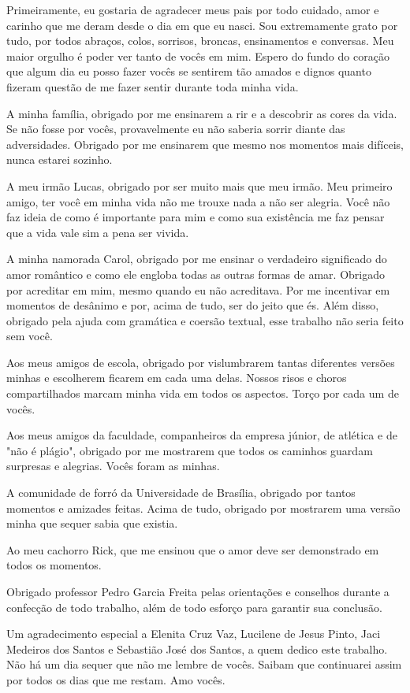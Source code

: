 Primeiramente, eu gostaria de agradecer meus pais por todo cuidado, amor e carinho que me deram desde o dia em que eu nasci. Sou extremamente grato por tudo, por todos abraços, colos, sorrisos, broncas, ensinamentos e conversas. Meu maior orgulho é poder ver tanto de vocês em mim. Espero do fundo do coração que algum dia eu posso fazer vocês se sentirem tão amados e dignos quanto fizeram questão de me fazer sentir durante toda minha vida.

A minha família, obrigado por me ensinarem a rir e a descobrir as cores da vida. Se não fosse por vocês, provavelmente eu não saberia sorrir diante das adversidades. Obrigado por me ensinarem que mesmo nos momentos mais difíceis, nunca estarei sozinho.

A meu irmão Lucas, obrigado por ser muito mais que meu irmão. Meu primeiro amigo, ter você em minha vida não me trouxe nada a não ser alegria. Você não faz ideia de como é importante para mim e como sua existência me faz pensar que a vida vale sim a pena ser vivida.

A minha namorada Carol, obrigado por me ensinar o verdadeiro significado do amor romântico e como ele engloba todas as outras formas de amar. Obrigado por acreditar em mim, mesmo quando eu não acreditava. Por me incentivar em momentos de desânimo e por, acima de tudo, ser do jeito que és. Além disso, obrigado pela ajuda com gramática e coersão textual, esse trabalho não seria feito sem você.

Aos meus amigos de escola, obrigado por vislumbrarem tantas diferentes versões minhas e escolherem ficarem em cada uma delas. Nossos risos e choros compartilhados marcam minha vida em todos os aspectos. Torço por cada um de vocês.

Aos meus amigos da faculdade, companheiros da empresa júnior, de atlética e de "não é plágio", obrigado por me mostrarem que todos os caminhos guardam surpresas e alegrias. Vocês foram as minhas.

A comunidade de forró da Universidade de Brasília, obrigado por tantos momentos e amizades feitas. Acima de tudo, obrigado por mostrarem uma versão minha que sequer sabia que existia.

Ao meu cachorro Rick, que me ensinou que o amor deve ser demonstrado em todos os momentos.

Obrigado professor Pedro Garcia Freita pelas orientações e conselhos durante a confecção de todo trabalho, além de todo esforço para garantir sua conclusão.

Um agradecimento especial a Elenita Cruz Vaz, Lucilene de Jesus Pinto, Jaci Medeiros dos Santos e Sebastião José dos Santos, a quem dedico este trabalho. Não há um dia sequer que não me lembre de vocês. Saibam que continuarei assim por todos os dias que me restam. Amo vocês.